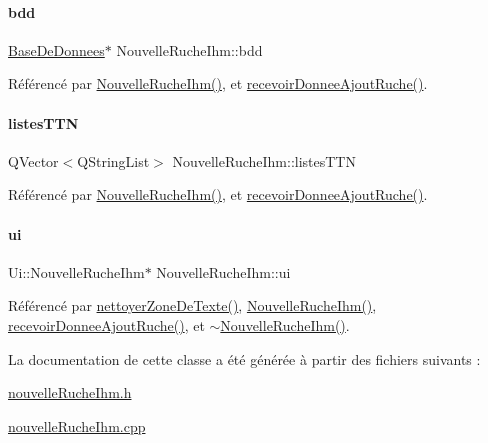 \paragraph{\texorpdfstring{bdd}{bdd}}
{\footnotesize\ttfamily \hyperlink{class_base_de_donnees}{Base\+De\+Donnees}$\ast$ Nouvelle\+Ruche\+Ihm\+::bdd\hspace{0.3cm}{\ttfamily [private]}}



Référencé par \hyperlink{class_nouvelle_ruche_ihm_a338b9af0b96ed0839a8d5008c8c89cc4}{Nouvelle\+Ruche\+Ihm()}, et \hyperlink{class_nouvelle_ruche_ihm_a268e781b033f2531ca5eab19cc828fdc}{recevoir\+Donnee\+Ajout\+Ruche()}.

\mbox{\label{class_nouvelle_ruche_ihm_a0c97db3419bafe928aabed3aa01d46fb}} 
\paragraph{\texorpdfstring{listes\+T\+TN}{listesTTN}}
{\footnotesize\ttfamily Q\+Vector$<$Q\+String\+List$>$ Nouvelle\+Ruche\+Ihm\+::listes\+T\+TN\hspace{0.3cm}{\ttfamily [private]}}



Référencé par \hyperlink{class_nouvelle_ruche_ihm_a338b9af0b96ed0839a8d5008c8c89cc4}{Nouvelle\+Ruche\+Ihm()}, et \hyperlink{class_nouvelle_ruche_ihm_a268e781b033f2531ca5eab19cc828fdc}{recevoir\+Donnee\+Ajout\+Ruche()}.

\mbox{\label{class_nouvelle_ruche_ihm_a46c1f0446fc75c67847d152d89d75960}} 
\paragraph{\texorpdfstring{ui}{ui}}
{\footnotesize\ttfamily Ui\+::\+Nouvelle\+Ruche\+Ihm$\ast$ Nouvelle\+Ruche\+Ihm\+::ui\hspace{0.3cm}{\ttfamily [private]}}



Référencé par \hyperlink{class_nouvelle_ruche_ihm_a09ddd61a2bd2b6779865e7d3b93ec2eb}{nettoyer\+Zone\+De\+Texte()}, \hyperlink{class_nouvelle_ruche_ihm_a338b9af0b96ed0839a8d5008c8c89cc4}{Nouvelle\+Ruche\+Ihm()}, \hyperlink{class_nouvelle_ruche_ihm_a268e781b033f2531ca5eab19cc828fdc}{recevoir\+Donnee\+Ajout\+Ruche()}, et \hyperlink{class_nouvelle_ruche_ihm_a17e5dfd1146574134eaa3ab8eae4f6d4}{$\sim$\+Nouvelle\+Ruche\+Ihm()}.



La documentation de cette classe a été générée à partir des fichiers suivants \+:\begin{DoxyCompactItemize}
\item 
\hyperlink{nouvelle_ruche_ihm_8h}{nouvelle\+Ruche\+Ihm.\+h}\item 
\hyperlink{nouvelle_ruche_ihm_8cpp}{nouvelle\+Ruche\+Ihm.\+cpp}\end{DoxyCompactItemize}
